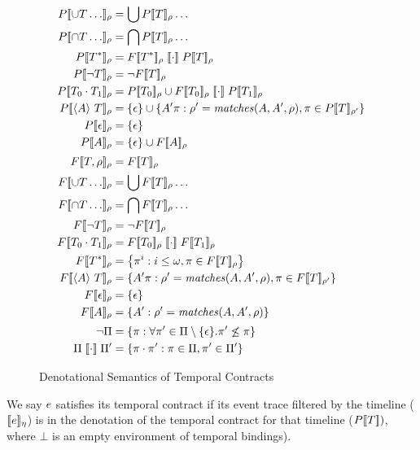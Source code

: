 \FloatBarrier
\begin{figure}
 \begin{align*}
   \denotetcone{\stOr{\mtcon \ldots}}{\menv} &= \bigcup\denotetcone{\mtcon}{\menv}\ldots
\\
    \denotetcone{\stAnd{\mtcon \ldots}}{\menv} &= \bigcap\denotetcone{\mtcon}{\menv}\ldots
\\
    \denotetcone{\stmany{\mtcon}}{\menv} &= \denotetconfulle{\stmany{\mtcon}}{\menv} \semseq \denotetcone{\mtcon}{\menv}
\\
    \denotetcone{\stnot{\mtcon}}{\menv} &= \semneg{\denotetconfulle{\mtcon}{\menv}}
\\
    \denotetcone{\stseq{\mtcon_0}{\mtcon_1}}{\menv} &= \denotetcone{\mtcon_0}{\menv} \cup \denotetconfulle{\mtcon_0}{\menv}\semseq \denotetcone{\mtcon_1}{\menv}
\\
    \denotetcone{\stbind{\mevent}{\mtcon}}{\menv} &= \setof{\epsilon} \cup \setbuild{\mevent' \mtrace}{\menv' = \matches(\mevent, \mevent', \menv), \mtrace \in \denotetcone{\mtcon}{\menv'}}
\\
    \denotetcone{\epsilon}{\menv} &= \setof{\epsilon}
\\
    \denotetcone{\mevent}{\menv} &= \setof{\epsilon} \cup \denotetconfulle{\mevent}{\menv}
\\[2pt]
    \denotetconfulle{\mtcon,\menv}{\menv} &= \denotetconfulle{\mtcon}{\menv}
\\
    \denotetconfulle{\stOr{\mtcon \ldots}}{\menv} &= \bigcup\denotetconfulle{\mtcon}{\menv}\ldots
\\
    \denotetconfulle{\stAnd{\mtcon \ldots}}{\menv} &= \bigcap\denotetconfulle{\mtcon}{\menv}\ldots
\\
    \denotetconfulle{\stnot{\mtcon}}{\menv} &= \semneg{\denotetconfulle{\mtcon}{\menv}}
\\
    \denotetconfulle{\stseq{\mtcon_0}{\mtcon_1}}{\menv} &= \denotetconfulle{\mtcon_0}{\menv} \semseq \denotetconfulle{\mtcon_1}{\menv}
\\
    \denotetconfulle{\stmany{\mtcon}}{\menv} &= \setbuild{\mtrace^i}{i \le \omega, \mtrace \in \denotetconfulle{\mtcon}{\menv}}
\\
    \denotetconfulle{\stbind{\mevent}{\mtcon}}{\menv} &= \setbuild{\mevent' \mtrace}{\menv' = \matches(\mevent, \mevent', \menv), \mtrace \in \denotetconfulle{\mtcon}{\menv'}}
\\
    \denotetconfulle{\epsilon}{\menv} &= \setof{\epsilon}
\\
    \denotetconfulle{\mevent}{\menv} &= \setbuild{\mevent'}{\menv' = \matches(\mevent, \mevent', \menv)}
\\[2pt]
    \semneg{\Pi} &= \setbuild{\mtrace}{\forall \mtrace' \in \Pi\setminus\setof{\epsilon}. \mtrace' \not\le \mtrace}
\\
    \Pi \semseq \Pi' &= \setbuild{\mtrace \cdot \mtrace'}{\mtrace \in \Pi, \mtrace' \in \Pi'}
 \end{align*}
  \caption{Denotational Semantics of Temporal Contracts}
  \label{fig:tcontract-denotation}
\end{figure}

%
We say $e$ satisfies its temporal contract if its event trace filtered by the timeline ($[\![ e ]\!]_\eta$) is in the denotation of the temporal contract for that timeline ($P[\![ T ]\!])$, where $\bot$ is an empty environment of temporal bindings).
%
